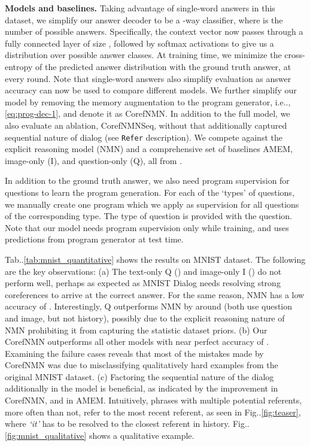 \documentclass[runningheads]{llncs}
\makeatletter
\DeclareRobustCommand\onedot{\futurelet\@let@token\@onedot}
\def\@onedot{\ifx\@let@token.\else.\null\fi\xspace}
\def\ie{i.e\onedot} \def\Ie{I.e\onedot}
\def\Fig{Fig\onedot}
\def\Table{Tab\onedot}
\newcommand{\nmn}{CorefNMN\xspace}
\newcommand{\myparagraph}[1]{\vspace{0pt}\noindent{\bf #1}}
\makeatother
\begin{document}
\noindent
\textbf{Models and baselines.}
Taking advantage of single-word answers in this dataset, 
we simplify our answer decoder to be a -way classifier, where  is the number of possible answers.
Specifically, the context vector  now passes through
a fully connected layer of size , followed by softmax activations to give
us a distribution over possible answer classes.
At training time, we minimize the cross-entropy  of the 
predicted answer distribution with the ground truth answer, at every round.
Note that single-word answers also simplify evaluation as answer accuracy can 
now be used to compare different models.
We further simplify our model by removing the memory augmentation to the
program generator, \ie,  \eqref{eq:prog-dec-1}, and denote it
as \nmn.
In addition to the full model, we also evaluate an ablation, 
\nmn{}Seq, without  that additionally captured 
sequential nature of dialog (see \texttt{Refer} description).
We compete against the explicit reasoning model (NMN) \cite{hu2017learning} and
a comprehensive set of baselines AMEM, image-only (I), and question-only (Q), 
all from \cite{paul2017visual}.


\myparagraph{Supervision.}
In addition to the ground truth answer, we also need program supervision for 
questions to learn the program generation.
For each of the  `types' of  questions, we manually create one program which
we apply as supervision for all questions of the corresponding type.
The type of question is provided with the question.
Note that our model needs program supervision only while training, and uses
predictions from program generator at test time.




\myparagraph{Results.}
\Table\ref{tab:mnist_quantitative} shows the results on MNIST dataset.
The following are the key observations:
(a) The text-only Q () and image-only I () do not perform well,
perhaps as expected as MNIST Dialog needs resolving strong coreferences to 
arrive at the correct answer.
For the same reason, NMN \cite{hu2017learning} has a low accuracy of .
Interestingly, Q outperforms NMN by around  (both use question and image,
but not history), possibly due to the explicit reasoning nature of NMN 
prohibiting it from capturing the statistic dataset priors.
(b) Our \nmn outperforms all other models with near perfect accuracy of .
Examining the failure cases reveals that most of the mistakes made by \nmn was
due to misclassifying qualitatively hard examples from the original MNIST 
dataset.
(c) Factoring the sequential nature of the dialog additionally in the model is
beneficial, as indicated by the  improvement in \nmn, and  in
AMEM.
Intuitively, phrases with multiple potential referents, more often
than not, refer to the most recent referent, as seen in \Fig\ref{fig:teaser}, 
where \textit{`it'} has to be resolved to the closest referent in history.
\Fig\ref{fig:mnist_qualitative} shows a qualitative example.
\end{document}
